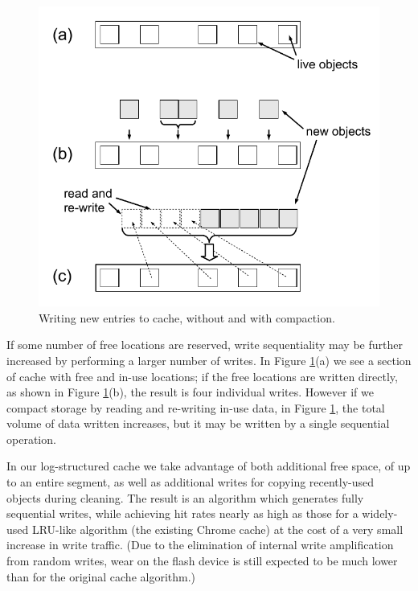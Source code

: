 \documentclass[letterpaper,twocolumn,10pt]{article}
\begin{document}
\begin{figure}
\centering
\includegraphics[width=\columnwidth]{graphs/re-write}
\caption{Writing new entries to cache, without and with compaction.}
\label{fig:rewrite}
\end{figure}

If some number of free locations are reserved, write sequentiality may
be further increased by performing a larger number of writes. In
Figure \ref{fig:rewrite}(a) we see a section of cache with free and in-use
locations; if the free locations are written directly, as shown in
Figure \ref{fig:rewrite}(b), the result is four individual writes.
However if we compact storage by reading and re-writing in-use data,
in Figure \ref{fig:rewrite}, the total volume of data written increases, but
it may be written by a single sequential operation.

In our log-structured cache we take advantage of both additional free
space, of up to an entire segment, as well as additional writes for
copying recently-used objects during cleaning. The result is an
algorithm which generates fully sequential writes, while achieving hit
rates nearly as high as those for a widely-used LRU-like algorithm
(the existing Chrome cache) at the cost of a very small increase in write
traffic. (Due to the elimination of internal write amplification from
random writes, wear on the flash device is still expected to be much
lower than for the original cache algorithm.)
\end{document}
